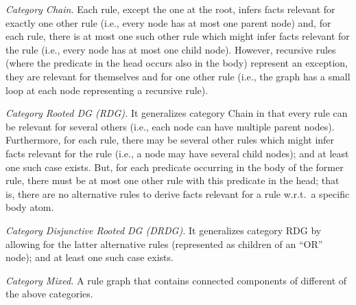 \documentclass[letterpaper]{article} \usepackage{aaai20}  \usepackage{times}  \usepackage{helvet} \usepackage{courier}  \usepackage[hyphens]{url}  \usepackage{graphicx} \urlstyle{rm} \def\UrlFont{\rm}  \usepackage{graphicx}  \frenchspacing  \setlength{\pdfpagewidth}{8.5in}  \setlength{\pdfpageheight}{11in}  \usepackage{amsthm}
\theoremstyle{definition}
\begin{document}
\textit{Category Chain.} Each rule, except the one at the root, infers facts relevant for exactly one other rule (i.e., every node has at most one parent node) and, for each rule, there is at most one such other rule which might infer facts relevant for the rule (i.e., every node has at most one child node). However, recursive rules (where the predicate in the head occurs also in the body) represent an exception, they are relevant for themselves and for one other rule (i.e., the graph has a small loop at each node representing a recursive rule).


\textit{Category Rooted DG (RDG).} It generalizes category Chain in that every rule can be relevant for several others (i.e., each node can have multiple parent nodes).
Furthermore, for each rule, there may be several other rules which might infer facts relevant for the rule (i.e., a node may have several child nodes); 
and at least one such case exists.
But, for each predicate occurring in the body of the former rule, there must be at most one other rule with this predicate in the head; that is, there are no alternative rules to derive facts relevant for a rule w.r.t.\ a specific body atom. 


\textit{Category Disjunctive Rooted DG (DRDG).} It generalizes category RDG by allowing for the latter alternative rules (represented as children of an ``OR'' node); and at least one such case exists.


\textit{Category Mixed.} A rule graph that contains connected components of different of the above categories. 
\end{document}
